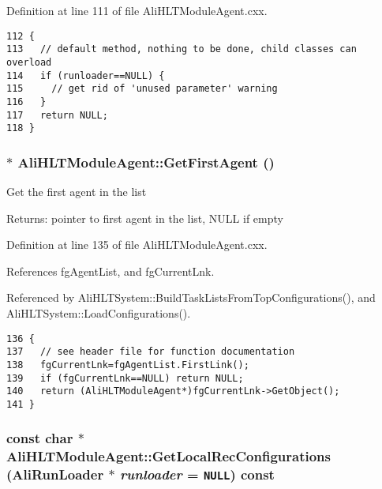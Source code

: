 Definition at line 111 of file Ali\-HLTModule\-Agent.cxx.

\footnotesize\begin{verbatim}112 {
113   // default method, nothing to be done, child classes can overload
114   if (runloader==NULL) {
115     // get rid of 'unused parameter' warning
116   }
117   return NULL;
118 }
\end{verbatim}\normalsize 


\subsubsection{ $\ast$ Ali\-HLTModule\-Agent::Get\-First\-Agent ()\hspace{0.3cm}{\tt  [static]}}\label{classAliHLTModuleAgent_e1}


Get the first agent in the list \begin{Desc}
\item[Returns:]pointer to first agent in the list, NULL if empty \end{Desc}


Definition at line 135 of file Ali\-HLTModule\-Agent.cxx.

References fg\-Agent\-List, and fg\-Current\-Lnk.

Referenced by Ali\-HLTSystem::Build\-Task\-Lists\-From\-Top\-Configurations(), and Ali\-HLTSystem::Load\-Configurations().

\footnotesize\begin{verbatim}136 {
137   // see header file for function documentation
138   fgCurrentLnk=fgAgentList.FirstLink();
139   if (fgCurrentLnk==NULL) return NULL;
140   return (AliHLTModuleAgent*)fgCurrentLnk->GetObject();
141 }
\end{verbatim}\normalsize 


\subsubsection{\setlength{\rightskip}{0pt plus 5cm}const char $\ast$ Ali\-HLTModule\-Agent::Get\-Local\-Rec\-Configurations (Ali\-Run\-Loader $\ast$ {\em runloader} = {\tt NULL}) const\hspace{0.3cm}{\tt  [virtual]}}\label{classAliHLTModuleAgent_a5}


